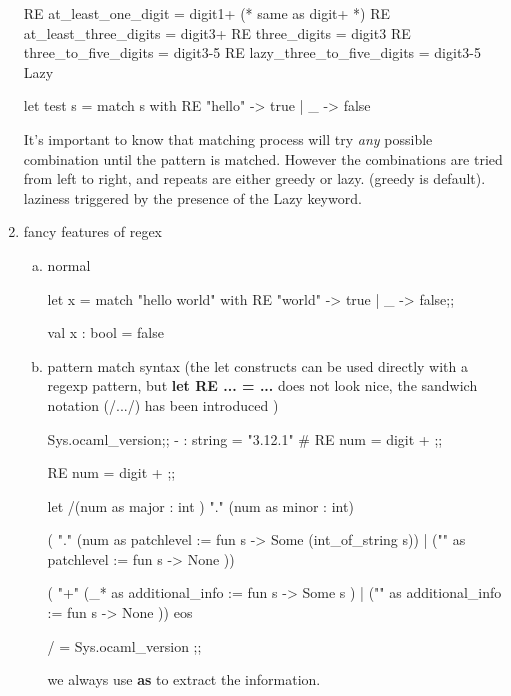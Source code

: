 \begin{enumerate}
\begin{bluecode}
RE at_least_one_digit = digit{1+}     (* same as digit+ *)
RE at_least_three_digits = digit{3+}
RE three_digits = digit{3}
RE three_to_five_digits = digit{3-5}
RE lazy_three_to_five_digits = digit{3-5} Lazy

let test s = match s with 
    RE "hello" -> true 
  | _ -> false 
\end{bluecode}


It's important to know that matching process will try \textit{any} possible combination until
the pattern is matched. However the combinations are tried from left to right, and
repeats are either greedy or lazy. (greedy is default). laziness triggered by the presence
of the Lazy keyword.

\item fancy features of regex
  \begin{enumerate}[(a)]
  \item normal

    \begin{redcode}
let x = match "hello world" with
  RE "world" -> true
 | _ -> false;;
\end{redcode}

    \begin{bluecode}
val x : bool = false
  \end{bluecode}

\item pattern match syntax 
  (the let constructs can be used directly with a
  regexp pattern, but \textbf{let RE ... = ... }does not look nice, the
  sandwich notation (/.../) has been introduced )

  \begin{alternate}
Sys.ocaml_version;;
- : string = "3.12.1"
# RE num = digit + ;;
\end{alternate}

\begin{redcode}

RE num = digit + ;;
  
let  /(num as major : int ) "." (num as minor : int)

( "." (num as patchlevel := fun s -> Some (int_of_string s)) 
| ("" as patchlevel := fun s -> None ))

( "+" (_*  as additional_info := fun s -> Some s )
| ("" as additional_info  := fun s -> None )) eos

/ = Sys.ocaml_version ;;

\end{redcode}

we always use \textbf{as} to extract the information.      


\end{enumerate}
\end{enumerate}
